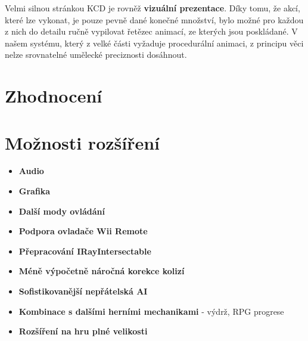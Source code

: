 Velmi silnou stránkou \acl{KCD} je rovněž \textbf{vizuální prezentace}. Díky tomu, že akcí, které lze vykonat, je pouze pevně dané konečné množství, bylo možné pro každou z nich do detailu ručně vypilovat řetězec animací, ze kterých jsou poskládané. V našem systému, který z velké části vyžaduje procedurální animaci, z principu věci nelze srovnatelné umělecké preciznosti dosáhnout. 


\section{Zhodnocení}

\section{Možnosti rozšíření}

\begin{itemize}
    \item \textbf{Audio}
    \item \textbf{Grafika}
    \item \textbf{Další mody ovládání}
    \item \textbf{Podpora ovladače Wii Remote}
    \item \textbf{Přepracování IRayIntersectable}
    \item \textbf{Méně výpočetně náročná korekce kolizí}
    \item \textbf{Sofistikovanější nepřátelská AI}
    \item \textbf{Kombinace s dalšími herními mechanikami} - výdrž, RPG progrese
    \item \textbf{Rozšíření na hru plné velikosti}
\end{itemize}